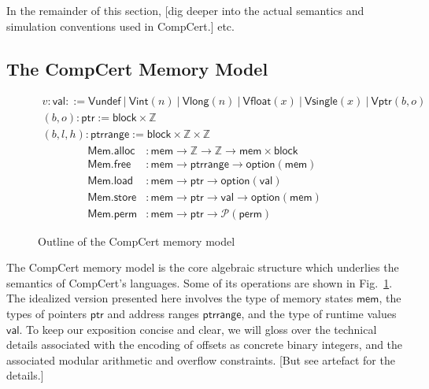 \documentclass[acmsmall,timestamp,review,anonymous]{acmart}
\newcommand{\kw}[1]{\ensuremath{ \mathsf{#1} }}
\newcommand{\alt}{\ |\ } %
\begin{document}
In the remainder of this section,
[dig deeper into the actual semantics and
simulation conventions used in CompCert.]
etc.


\subsection{The CompCert Memory Model} \label{sec:compcert:mm} %

\begin{figure} %
  \begin{gather*}
    v : \kw{val} ::=
      \kw{Vundef} \alt
      \kw{Vint}(n) \alt
      \kw{Vlong}(n) \alt
      \kw{Vfloat}(x) \alt
      \kw{Vsingle}(x) \alt
      \kw{Vptr}(b, o)
    \\
    (b, o) : \kw{ptr} :=
      \kw{block} \times \mathbb{Z}
    \\
    (b, l, h) : \kw{ptrrange} :=
      \kw{block} \times \mathbb{Z} \times \mathbb{Z}
  \end{gather*}
  \begin{align*}
    \kw{Mem.alloc} &:
      \kw{mem} \rightarrow \mathbb{Z} \rightarrow \mathbb{Z} \rightarrow
      \kw{mem} \times \kw{block}
    \\
    \kw{Mem.free} &:
      \kw{mem} \rightarrow
      \kw{ptrrange} \rightarrow
      \kw{option}(\kw{mem})
    \\
    \kw{Mem.load} &:
      \kw{mem} \rightarrow \kw{ptr} \rightarrow \kw{option}(\kw{val})
    \\
    \kw{Mem.store} &:
      \kw{mem} \rightarrow \kw{ptr} \rightarrow \kw{val} \rightarrow \kw{option}(\kw{mem})
    \\
    \kw{Mem.perm} &:
      \kw{mem} \rightarrow \kw{ptr} \rightarrow \mathcal{P}(\kw{perm})
  \end{align*}
  \caption{Outline of the CompCert memory model}
  \label{fig:mm}
\end{figure}

The CompCert memory model \cite{compcertmmv2}
is the core algebraic structure
which underlies the semantics of CompCert's languages.
Some of its operations
are shown in Fig.~\ref{fig:mm}.
The idealized version presented here
involves
the type of memory states \kw{mem},
the types of pointers \kw{ptr} and address ranges \kw{ptrrange}, and
the type of runtime values \kw{val}.
To keep our exposition concise and clear,
we will gloss over the technical details
associated with the encoding of offsets
as concrete binary integers,
and the associated modular arithmetic and overflow constraints.
[But see artefact for the details.]
\end{document}
